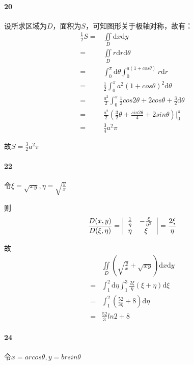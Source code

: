 \documentclass[UTF8]{ctexart}
\begin{document}
\paragraph*{20}
设所求区域为$D$，面积为$S$，可知图形关于极轴对称，故有：
\begin{align*}
    \frac{1}{2} S=& \iint \limits_D \mathrm{d}x \mathrm{d}y \\
     =& \iint \limits_D r \mathrm{d}r \mathrm{d}\theta \\
     =& \int_{0}^{\pi} \mathrm{d}\theta \int_{0}^{a(1 + cos\theta)} r \mathrm{d}r \\
     =& \frac{1}{2} \int_{0}^{\pi} a^2(1+cos\theta)^2 \mathrm{d}\theta \\
     =& \frac{a^2}{2} \int_{0}^{\pi} \frac{1}{2} cos2\theta + 2cos\theta + \frac{3}{2} \mathrm{d}\theta \\
     =& \frac{a^2}{2} (\frac{3}{2} \theta + \frac{sin2\theta}{4} + 2sin\theta) \big|_{0}^{\pi} \\
     =& \frac{3}{4} a^2 \pi
\end{align*}

故$S=\frac{3}{2} a^2 \pi$

\paragraph*{22}
令$\xi = \sqrt{xy}, \eta = \sqrt{\frac{y}{x} } $

则
\[
    \frac{D(x,y)}{D(\xi,\eta)} = 
    \left| \begin{array}{cccc}
        \frac{1}{\eta} & -\frac{\xi}{\eta^2} \\
        \eta & \xi
    \end{array} \right| = \frac{2\xi}{\eta} \\
\]

故
\begin{align*}
    &\iint \limits_D (\sqrt{\frac{y}{x}} + \sqrt{xy} )\mathrm{d}x \mathrm{d}y \\
    =& \int_{1}^{2} \mathrm{d}\eta \int_{1}^{3} \frac{2\xi}{\eta} (\xi + \eta)\mathrm{d}\xi \\
    =& \int_{1}^{2} (\frac{52}{3\eta} +8) \mathrm{d}\eta \\
    =& \frac{52}{3} ln2 + 8
\end{align*}
\paragraph*{24}
令$x=arcos\theta,y=brsin\theta$
\end{document}
